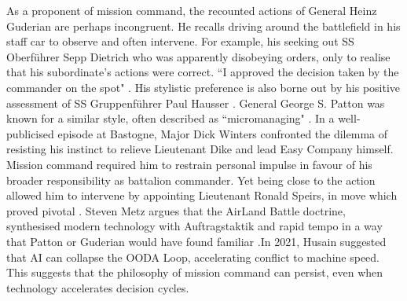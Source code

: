 As a proponent of mission command, the recounted actions of General Heinz Guderian are perhaps incongruent. He recalls driving around the battlefield in his staff car to observe and often intervene. For example, his seeking out SS Oberf\"uhrer Sepp Dietrich who was apparently disobeying orders, only to realise that his subordinate's actions were correct. ``I approved the decision taken by the commander on the spot" \parencite[p.~117]{GUDERIAN_1952}. His stylistic preference is also borne out by his positive assessment of SS Gruppenf\"uhrer Paul Hausser \parencite[p.~73]{YEIDE_2011}. General George S. Patton was known for a similar style, often described as ``micromanaging" \parencite[p.~34]{ZALOGA_2010}. In a well-publicised episode at Bastogne, Major Dick Winters confronted the dilemma of resisting his instinct to relieve Lieutenant Dike and lead Easy Company himself. Mission command required him to restrain personal impulse in favour of his broader responsibility as battalion commander. Yet being close to the action allowed him to intervene by appointing Lieutenant Ronald Speirs, in move which proved pivotal \parencite[p.~186]{WINTERS_2006}. Steven Metz argues that the AirLand Battle doctrine, synthesised modern technology with Auftragstaktik and rapid tempo in a way that Patton or Guderian would have found familiar \parencite{METZ_2000}.\nocite{HUSAIN_2021}In 2021, Husain suggested that AI can collapse the OODA Loop, accelerating conflict to machine speed. This suggests that the philosophy of mission command can persist, even when technology accelerates decision cycles. 

